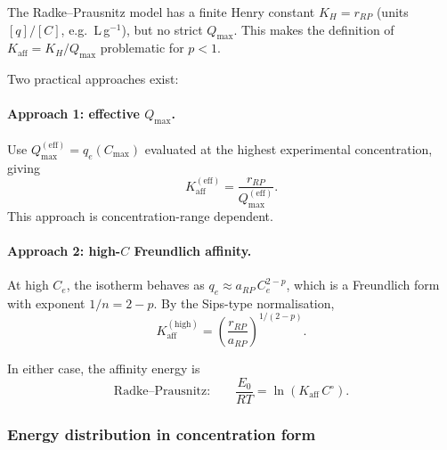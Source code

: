 	The Radke--Prausnitz model has a finite Henry constant
	$K_H = r_{RP}$ (units $[q]/[C]$, e.g.\ L\,g$^{-1}$), but
	no strict $Q_{\max}$.  This makes the definition of
	$K_{\mathrm{aff}} = K_H / Q_{\max}$ problematic for
	$p < 1$.

	Two practical approaches exist:

	\paragraph{Approach 1: effective $Q_{\max}$.}
	Use $Q_{\max}^{\mathrm{(eff)}} = q_e(C_{\max})$ evaluated at
	the highest experimental concentration, giving
	\begin{equation}
		K_{\mathrm{aff}}^{\mathrm{(eff)}}
		= \frac{r_{RP}}{Q_{\max}^{\mathrm{(eff)}}}.
	\end{equation}
	This approach is concentration-range dependent.

	\paragraph{Approach 2: high-$C$ Freundlich affinity.}
	At high $C_e$, the isotherm behaves as
	$q_e \approx a_{RP}\,C_e^{2-p}$, which is a Freundlich form
	with exponent $1/n = 2 - p$.  By the Sips-type normalisation,
	\begin{equation}
		K_{\mathrm{aff}}^{\mathrm{(high)}}
		= \left(\frac{r_{RP}}{a_{RP}}\right)^{1/(2-p)}.
		\label{eq:Kaff_RadkePrausnitz}
	\end{equation}

	In either case, the affinity energy is
	\begin{equation}
		\text{Radke--Prausnitz:}\qquad
		\frac{E_0}{RT}
		= \ln(K_{\mathrm{aff}}\,C^\circ).
		\label{eq:E_RadkePrausnitz}
	\end{equation}

	\subsubsection{Energy distribution in concentration form}

